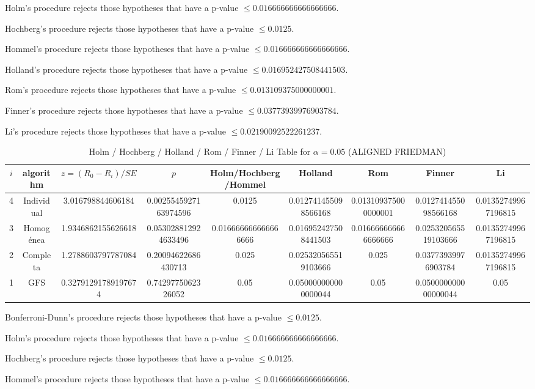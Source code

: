 \documentclass[a4paper,10pt]{article}
\begin{document}
\begin{landscape}
Holm's procedure rejects those hypotheses that have a p-value $\le0.016666666666666666$.


Hochberg's procedure rejects those hypotheses that have a p-value $\le0.0125$.


Hommel's procedure rejects those hypotheses that have a p-value $\le0.016666666666666666$.


Holland's procedure rejects those hypotheses that have a p-value $\le0.016952427508441503$.


Rom's procedure rejects those hypotheses that have a p-value $\le0.013109375000000001$.


Finner's procedure rejects those hypotheses that have a p-value $\le0.03773939976903784$.


Li's procedure rejects those hypotheses that have a p-value $\le0.02190092522261237$.



\newpage

\begin{table}[!htp]
\centering\scriptsize
\caption{Holm / Hochberg / Holland / Rom / Finner / Li Table for $\alpha=0.05$ (ALIGNED FRIEDMAN)}
\begin{tabular}{ccccccccc}
$i$&algorithm&$z=(R_0 - R_i)/SE$&$p$&Holm/Hochberg/Hommel&Holland&Rom&Finner&Li\\
\hline
4&Individual&3.016798844606184&0.0025545927163974596&0.0125&0.012741455098566168&0.013109375000000001&0.012741455098566168&0.01352749967196815\\
3&Homogénea&1.9346862155626618&0.053028812924633496&0.016666666666666666&0.016952427508441503&0.016666666666666666&0.025320565519103666&0.01352749967196815\\
2&Completa&1.2788603797787084&0.20094622686430713&0.025&0.025320565519103666&0.025&0.03773939976903784&0.01352749967196815\\
1&GFS&0.32791291789197674&0.7429775062326052&0.05&0.050000000000000044&0.05&0.050000000000000044&0.05\\
\hline
\end{tabular}
\end{table}
Bonferroni-Dunn's procedure rejects those hypotheses that have a p-value $\le0.0125$.


Holm's procedure rejects those hypotheses that have a p-value $\le0.016666666666666666$.


Hochberg's procedure rejects those hypotheses that have a p-value $\le0.0125$.


Hommel's procedure rejects those hypotheses that have a p-value $\le0.016666666666666666$.



\end{landscape}
\end{document}
